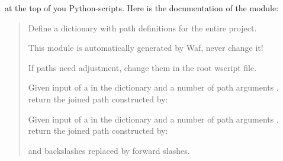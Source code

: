\documentclass[a4paper,11pt,english]{sphinxmanual}
\begin{document}
at the top of you Python-scripts. Here is the documentation of the module:
\begin{quote}


\label{\detokenize{introduction:module-bld.project_paths}}
Define a dictionary  with path
definitions for the entire project.

This module is automatically generated by Waf, never change it!

If paths need adjustment, change them in the root wscript file.

\begin{fulllineitems}
\label{\detokenize{introduction:bld.project_paths.project_paths_join}}
Given input of a  in the  dictionary and a number
of path arguments , return the joined path constructed by:

%
\begin{sphinxVerbatim}[commandchars=\\\{\}]
\PYG{p}{[}\PYG{p}{]} 
\end{sphinxVerbatim}

\end{fulllineitems}


\begin{fulllineitems}
\label{\detokenize{introduction:bld.project_paths.project_paths_join_latex}}
Given input of a  in the  dictionary and a number
of path arguments , return the joined path constructed by:

%
\begin{sphinxVerbatim}[commandchars=\\\{\}]
\PYG{p}{[}\PYG{p}{]} 
\end{sphinxVerbatim}

and backslashes replaced by forward slashes.

\end{fulllineitems}

\end{quote}
\end{document}
